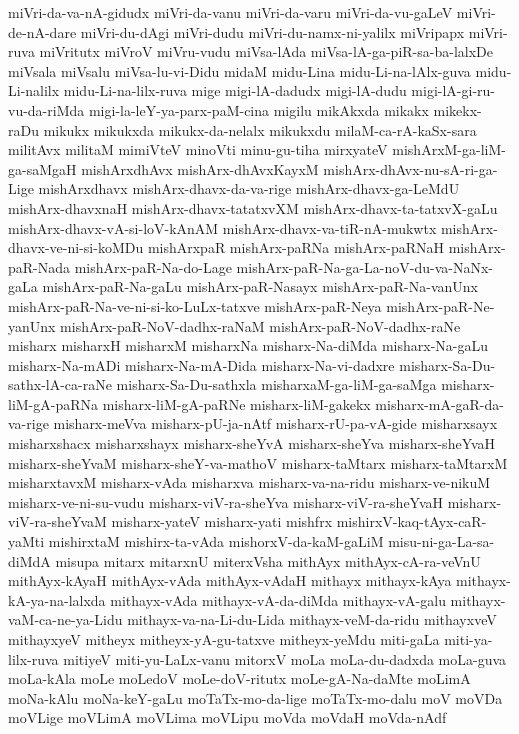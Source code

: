 {miVri-da-va-nA-gidudx
miVri-da-vanu
miVri-da-varu
miVri-da-vu-gaLeV
miVri-de-nA-dare
miVri-du-dAgi
miVri-dudu
miVri-du-namx-ni-yalilx
miVripapx
miVri-ruva
miVritutx
miVroV
miVru-vudu
miVsa-lAda
miVsa-lA-ga-piR-sa-ba-lalxDe
miVsala
miVsalu
miVsa-lu-vi-Didu
midaM
midu-Lina
midu-Li-na-lAlx-guva
midu-Li-nalilx
midu-Li-na-lilx-ruva
mige
migi-lA-dadudx
migi-lA-dudu
migi-lA-gi-ru-vu-da-riMda
migi-la-leY-ya-parx-paM-cina
migilu
mikAkxda
mikakx
mikekx-raDu
mikukx
mikukxda
mikukx-da-nelalx
mikukxdu
milaM-ca-rA-kaSx-sara
militAvx
militaM
mimiVteV
minoVti
minu-gu-tiha
mirxyateV
mishArxM-ga-liM-ga-saMgaH
mishArxdhAvx
mishArx-dhAvxKayxM
mishArx-dhAvx-nu-sA-ri-ga-Lige
mishArxdhavx
mishArx-dhavx-da-va-rige
mishArx-dhavx-ga-LeMdU
mishArx-dhavxnaH
mishArx-dhavx-tatatxvXM
mishArx-dhavx-ta-tatxvX-gaLu
mishArx-dhavx-vA-si-loV-kAnAM
mishArx-dhavx-va-tiR-nA-mukwtx
mishArx-dhavx-ve-ni-si-koMDu
mishArxpaR
mishArx-paRNa
mishArx-paRNaH
mishArx-paR-Nada
mishArx-paR-Na-do-Lage
mishArx-paR-Na-ga-La-noV-du-va-NaNx-gaLa
mishArx-paR-Na-gaLu
mishArx-paR-Nasayx
mishArx-paR-Na-vanUnx
mishArx-paR-Na-ve-ni-si-ko-LuLx-tatxve
mishArx-paR-Neya
mishArx-paR-Ne-yanUnx
mishArx-paR-NoV-dadhx-raNaM
mishArx-paR-NoV-dadhx-raNe
misharx
misharxH
misharxM
misharxNa
misharx-Na-diMda
misharx-Na-gaLu
misharx-Na-mADi
misharx-Na-mA-Dida
misharx-Na-vi-dadxre
misharx-Sa-Du-sathx-lA-ca-raNe
misharx-Sa-Du-sathxla
misharxaM-ga-liM-ga-saMga
misharx-liM-gA-paRNa
misharx-liM-gA-paRNe
misharx-liM-gakekx
misharx-mA-gaR-da-va-rige
misharx-meVva
misharx-pU-ja-nAtf
misharx-rU-pa-vA-gide
misharxsayx
misharxshacx
misharxshayx
misharx-sheYvA
misharx-sheYva
misharx-sheYvaH
misharx-sheYvaM
misharx-sheY-va-mathoV
misharx-taMtarx
misharx-taMtarxM
misharxtavxM
misharx-vAda
misharxva
misharx-va-na-ridu
misharx-ve-nikuM
misharx-ve-ni-su-vudu
misharx-viV-ra-sheYva
misharx-viV-ra-sheYvaH
misharx-viV-ra-sheYvaM
misharx-yateV
misharx-yati
mishfrx
mishirxV-kaq-tAyx-caR-yaMti
mishirxtaM
mishirx-ta-vAda
mishorxV-da-kaM-gaLiM
misu-ni-ga-La-sa-diMdA
misupa
mitarx
mitarxnU
miterxVsha
mithAyx
mithAyx-cA-ra-veVnU
mithAyx-kAyaH
mithAyx-vAda
mithAyx-vAdaH
mithayx
mithayx-kAya
mithayx-kA-ya-na-lalxda
mithayx-vAda
mithayx-vA-da-diMda
mithayx-vA-galu
mithayx-vaM-ca-ne-ya-Lidu
mithayx-va-na-Li-du-Lida
mithayx-veM-da-ridu
mithayxveV
mithayxyeV
mitheyx
mitheyx-yA-gu-tatxve
mitheyx-yeMdu
miti-gaLa
miti-ya-lilx-ruva
mitiyeV
miti-yu-LaLx-vanu
mitorxV
moLa
moLa-du-dadxda
moLa-guva
moLa-kAla
moLe
moLedoV
moLe-doV-ritutx
moLe-gA-Na-daMte
moLimA
moNa-kAlu
moNa-keY-gaLu
moTaTx-mo-da-lige
moTaTx-mo-dalu
moV
moVDa
moVLige
moVLimA
moVLima
moVLipu
moVda
moVdaH
moVda-nAdf
}
